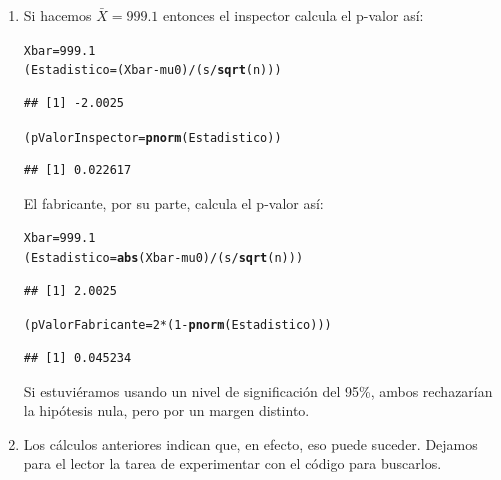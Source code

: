 \documentclass[10pt,a4paper]{article}\usepackage[]{graphicx}\usepackage[]{color}
\makeatletter
\newcommand{\hlnum}[1]{\textcolor[rgb]{0.686,0.059,0.569}{#1}}%
\newcommand{\hlopt}[1]{\textcolor[rgb]{0,0,0}{#1}}%
\newcommand{\hlstd}[1]{\textcolor[rgb]{0.345,0.345,0.345}{#1}}%
\newcommand{\hlkwb}[1]{\textcolor[rgb]{0.69,0.353,0.396}{#1}}%
\newcommand{\hlkwd}[1]{\textcolor[rgb]{0.737,0.353,0.396}{\textbf{#1}}}%
\newenvironment{kframe}{%
 \def\at@end@of@kframe{}%
 \ifinner\ifhmode%
  \def\at@end@of@kframe{\end{minipage}}%
  \begin{minipage}{\columnwidth}%
 \fi\fi%
 \def\FrameCommand##1{\hskip\@totalleftmargin \hskip-\fboxsep
 \colorbox{shadecolor}{##1}\hskip-\fboxsep
     \hskip-\linewidth \hskip-\@totalleftmargin \hskip\columnwidth}%
 \MakeFramed {\advance\hsize-\width
   \@totalleftmargin\z@ \linewidth\hsize
   \@setminipage}}%
 {\par\unskip\endMakeFramed%
 \at@end@of@kframe}
\newenvironment{knitrout}{}{} %
\makeatother
\begin{document}
\begin{enumerate}
  \item Si hacemos $\bar X=999.1$ entonces el inspector calcula el p-valor así:
\begin{knitrout}
\color{fgcolor}\begin{kframe}
\begin{alltt}
\hlstd{Xbar} \hlkwb{=} \hlnum{999.1}
\hlstd{(Estadistico} \hlkwb{=} \hlstd{(Xbar} \hlopt{-} \hlstd{mu0)} \hlopt{/} \hlstd{(s} \hlopt{/} \hlkwd{sqrt}\hlstd{(n)))}
\end{alltt}
\begin{verbatim}
## [1] -2.0025
\end{verbatim}
\begin{alltt}
\hlstd{(pValorInspector} \hlkwb{=} \hlkwd{pnorm}\hlstd{(Estadistico))}
\end{alltt}
\begin{verbatim}
## [1] 0.022617
\end{verbatim}
\end{kframe}
\end{knitrout}
    El fabricante, por su parte, calcula el p-valor así:
\begin{knitrout}
\color{fgcolor}\begin{kframe}
\begin{alltt}
\hlstd{Xbar} \hlkwb{=} \hlnum{999.1}
\hlstd{(Estadistico} \hlkwb{=} \hlkwd{abs}\hlstd{(Xbar} \hlopt{-} \hlstd{mu0)} \hlopt{/} \hlstd{(s} \hlopt{/} \hlkwd{sqrt}\hlstd{(n)))}
\end{alltt}
\begin{verbatim}
## [1] 2.0025
\end{verbatim}
\begin{alltt}
\hlstd{(pValorFabricante} \hlkwb{=} \hlnum{2} \hlopt{*} \hlstd{(}\hlnum{1} \hlopt{-} \hlkwd{pnorm}\hlstd{(Estadistico)))}
\end{alltt}
\begin{verbatim}
## [1] 0.045234
\end{verbatim}
\end{kframe}
\end{knitrout}
    Si estuviéramos usando un nivel de significación del 95\%, ambos rechazarían la hipótesis nula, pero por un margen distinto.

  \item Los cálculos anteriores indican que, en efecto, eso puede suceder. Dejamos  para el lector la tarea de experimentar con el código para buscarlos.
\end{enumerate}
\end{document}
